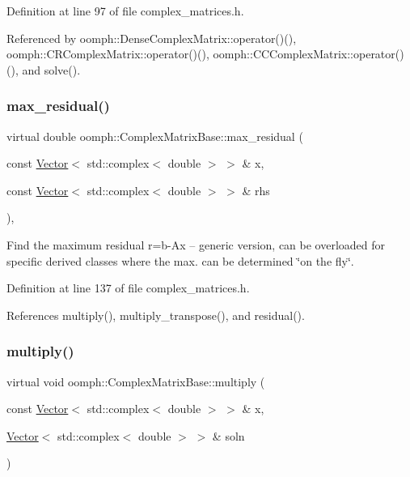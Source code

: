 Definition at line 97 of file complex\+\_\+matrices.\+h.



Referenced by oomph\+::\+Dense\+Complex\+Matrix\+::operator()(), oomph\+::\+C\+R\+Complex\+Matrix\+::operator()(), oomph\+::\+C\+C\+Complex\+Matrix\+::operator()(), and solve().

\mbox{\label{classoomph_1_1ComplexMatrixBase_ab5ad285a4cb503c9c962ff7e8d89857f}} 
\subsubsection{\texorpdfstring{max\+\_\+residual()}{max\_residual()}}
{\footnotesize\ttfamily virtual double oomph\+::\+Complex\+Matrix\+Base\+::max\+\_\+residual (\begin{DoxyParamCaption}\item[{const \hyperlink{classoomph_1_1Vector}{Vector}$<$ std\+::complex$<$ double $>$ $>$ \&}]{x,  }\item[{const \hyperlink{classoomph_1_1Vector}{Vector}$<$ std\+::complex$<$ double $>$ $>$ \&}]{rhs }\end{DoxyParamCaption})\hspace{0.3cm}{\ttfamily [inline]}, {\ttfamily [virtual]}}



Find the maximum residual r=b-\/\+Ax -- generic version, can be overloaded for specific derived classes where the max. can be determined \char`\"{}on the fly\char`\"{}. 



Definition at line 137 of file complex\+\_\+matrices.\+h.



References multiply(), multiply\+\_\+transpose(), and residual().

\mbox{\label{classoomph_1_1ComplexMatrixBase_a730c106643464a29ebf0660a6921ebaa}} 
\subsubsection{\texorpdfstring{multiply()}{multiply()}}
{\footnotesize\ttfamily virtual void oomph\+::\+Complex\+Matrix\+Base\+::multiply (\begin{DoxyParamCaption}\item[{const \hyperlink{classoomph_1_1Vector}{Vector}$<$ std\+::complex$<$ double $>$ $>$ \&}]{x,  }\item[{\hyperlink{classoomph_1_1Vector}{Vector}$<$ std\+::complex$<$ double $>$ $>$ \&}]{soln }\end{DoxyParamCaption})\hspace{0.3cm}{\ttfamily [pure virtual]}}



